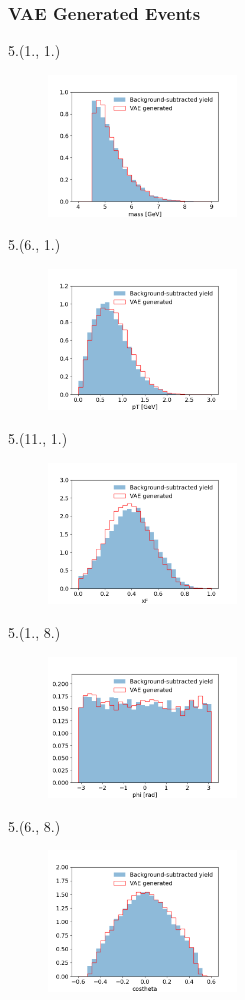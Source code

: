 \documentclass[12pt, xcolor={dvipsnames}, aspectratio = 169, sans,mathserif]{beamer}
\newenvironment{Pic}[2]
{\begin{textblock}{#1}#2
\begin{figure}}
{\end{figure}
\end{textblock}}
\begin{document}
\begin{frame}
\frametitle{VAE Generated Events}

\begin{Pic}{5.}{(1., 1.)}
    \includegraphics[width=5.0cm]{imgs/mass.png}
\end{Pic}

\begin{Pic}{5.}{(6., 1.)}
    \includegraphics[width=5.0cm]{imgs/pT.png}
\end{Pic}

\begin{Pic}{5.}{(11., 1.)}
    \includegraphics[width=5.0cm]{imgs/xF.png}
\end{Pic}

\begin{Pic}{5.}{(1., 8.)}
    \includegraphics[width=5.0cm]{imgs/phi.png}
\end{Pic}

\begin{Pic}{5.}{(6., 8.)}
    \includegraphics[width=5.0cm]{imgs/costh.png}
\end{Pic}


\end{frame}
\end{document}

